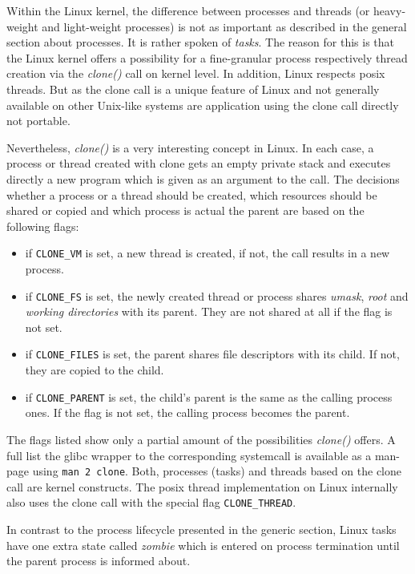 Within the Linux kernel, the difference between processes and threads (or heavy-weight and light-weight processes) is not as important as described in the general section about processes.
It is rather spoken of \textit{tasks}.
The reason for this is that the Linux kernel offers a possibility for a fine-granular process respectively thread creation via the \textit{clone()} call on kernel level.
In addition, Linux respects \ac{posix} threads\cite{lfd430}.
But as the clone call is a unique feature of Linux and not generally available on other Unix-like systems are application using the clone call directly not portable\cite{tanenbaum-modern-operating-systems}.

Nevertheless, \textit{clone()} is a very interesting concept in Linux.
In each case, a process or thread created with clone gets an empty private stack and executes directly a new program which is given as an argument to the call.
The decisions whether a process or a thread should be created, which resources should be shared or copied and which process is actual the parent are based on the following flags:
\begin{itemize}
    \item if \texttt{CLONE\_VM} is set, a new thread is created, if not, the call results in a new process.
    \item if \texttt{CLONE\_FS} is set, the newly created thread or process shares \textit{umask}, \textit{root} and \textit{working directories} with its parent. They are not shared at all if the flag is not set.
    \item if \texttt{CLONE\_FILES} is set, the parent shares file descriptors with its child. If not, they are copied to the child.
    \item if \texttt{CLONE\_PARENT} is set, the child's parent is the same as the calling process ones. If the flag is not set, the calling process becomes the parent\cite{tanenbaum-modern-operating-systems}.
\end{itemize}

The flags listed show only a partial amount of the possibilities \textit{clone()} offers.
A full list the glibc wrapper to the corresponding systemcall is available as a man-page using \texttt{man 2 clone}.
Both, processes (tasks) and threads based on the clone call are kernel constructs.
The \ac{posix} thread implementation on Linux internally also uses the clone call with the special flag \texttt{CLONE\_THREAD}.

In contrast to the process lifecycle presented in the generic section, Linux tasks have one extra state called \textit{zombie} which is entered on process termination until the parent process is informed about\cite{mandl2014Grundkurs}.


